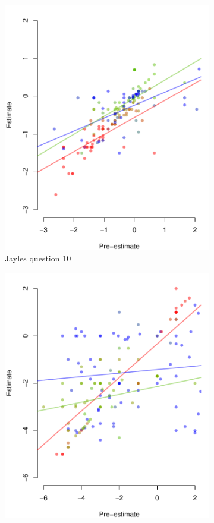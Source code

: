 \documentclass[10pt,a4paper,twocolumn,lineno]{article}
\begin{document}
\begin{figure}[htbp]
\begin{subfigure}[b]{.24\textwidth}
		\includegraphics[width=\textwidth]{../plots/jayles10_vs_xp.pdf}
		\caption{Jayles question 10}
	\end{subfigure}
	\begin{subfigure}[b]{.24\textwidth}
		\includegraphics[width=\textwidth]{../plots/jayles23_vs_xp.pdf}

\end{subfigure}
\end{figure}
\end{document}
